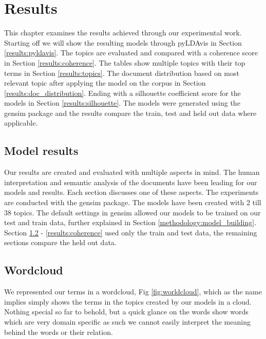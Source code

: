 \chapter{Results}
\label{ch:results}

This chapter examines the results achieved through our experimental work.
Starting off we will show the resulting models through pyLDAvis in Section \ref{results:pyldavis}. The topics are evaluated and compared with a coherence score in Section \ref{results:coherence}. The tables show multiple topics with their top terms in Section \ref{results:topics}. The document distribution based on most relevant topic after applying the model on the corpus in Section \ref{results:doc_distribution}. Ending with a silhouette coefficient score for the models in Section \ref{results:silhouette}. The models were generated using the gensim package and the results compare the train, test and held out data where applicable. 



\section{Model results}\label{results:modelresults}
Our results are created and evaluated with multiple aspects in mind. The human interpretation and semantic analysis of the documents have been leading for our models and results. Each section discusses one of these aspects. The experiments are conducted with the gensim package. The models have been created with 2 till 38 topics. The default settings in gensim allowed our models to be trained on our test and train data, further explained in Section \ref{methodology:model_building}. Section \ref{results:wordcloud} - \ref{results:coherence} used only the train and test data, the remaining sections compare the held out data.

\FloatBarrier
\section{Wordcloud}\label{results:wordcloud}
We represented our terms in a wordcloud, Fig \ref{fig:worldcloud}, which as the name implies simply shows the terms in the topics created by our models in a cloud. Nothing special so far to behold, but a quick glance on the words show words which are very domain specific as such we cannot easily interpret the meaning behind the words or their relation.

